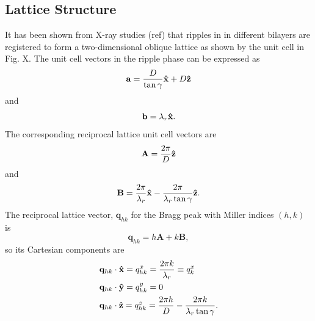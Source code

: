 \subsection{Lattice Structure}\label{sec:lattice_structure}
It has been shown from X-ray studies (ref) that ripples in in different bilayers
are registered to form a two-dimensional oblique lattice as shown by the unit 
cell in Fig. X. 
The unit cell vectors in the ripple phase can be expressed as 
\begin{equation}
  \mathbf{a} = \frac{D}{\tan\gamma}\mathbf{\hat{x}} + D\mathbf{\hat{z}}
\end{equation}
and
\begin{equation}
  \mathbf{b} = \lambda_r\mathbf{\hat{x}}.
\end{equation}
The corresponding reciprocal lattice unit cell vectors are
\begin{equation}
  \mathbf{A} = \frac{2\pi}{D}\mathbf{\hat{z}}
\end{equation}
and
\begin{equation}
  \mathbf{B} = \frac{2\pi}{\lambda_r}\mathbf{\hat{x}} - \frac{2\pi}{\lambda_r\tan\gamma}\mathbf{\hat{z}}.
\end{equation}
The reciprocal lattice vector, $\mathbf{q}_{hk}$ for the Bragg peak with 
Miller indices $(h,k)$ is 
\begin{equation}
  \mathbf{q}_{hk}=h\mathbf{A}+k\mathbf{B},
\end{equation}
so its Cartesian components are
\begin{align}
  & \mathbf{q}_{hk}\cdot\mathbf{\hat{x}} = q_{hk}^x = \frac{2\pi k}{\lambda_r} \equiv q_{k}^x \\
  & \mathbf{q}_{hk}\cdot\mathbf{\hat{y}} = q_{hk}^y = 0 \\
  & \mathbf{q}_{hk}\cdot\mathbf{\hat{z}} = q_{hk}^z = \frac{2\pi h}{D} - \frac{2\pi k}{\lambda_r\tan\gamma}.
\end{align}

